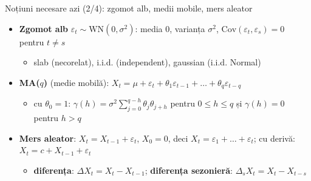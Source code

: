 \begin{frame}{Noțiuni necesare azi (2/4): zgomot alb, medii mobile, mers aleator}
\itemsize{\small}
\begin{itemize}
    \item \textbf{Zgomot alb} $\varepsilon_t \sim \mathrm{WN}(0, \sigma^2)$: media 0, varianța $\sigma^2$, $\mathrm{Cov}(\varepsilon_t, \varepsilon_s) = 0$ pentru $t \ne s$
    \begin{itemize}
        \item slab (necorelat), i.i.d. (independent), gaussian (i.i.d. Normal)
    \end{itemize}
    \item \textbf{MA($q$)} (medie mobilă): $X_t = \mu + \varepsilon_t + \theta_1\varepsilon_{t-1} + \dots + \theta_q\varepsilon_{t-q}$
    \begin{itemize}
        \item cu $\theta_0 = 1$: $\gamma(h) = \sigma^2\sum_{j=0}^{q-h}\theta_j\theta_{j+h}$ pentru $0 \le h \le q$ și $\gamma(h) = 0$ pentru $h > q$
    \end{itemize}
    \item \textbf{Mers aleator}: $X_t = X_{t-1} + \varepsilon_t$, $X_0 = 0$, deci $X_t = \varepsilon_1 + \dots + \varepsilon_t$; cu derivă: $X_t = c + X_{t-1} + \varepsilon_t$
    \begin{itemize}
        \item \textbf{diferența}: $\Delta X_t = X_t - X_{t-1}$; \textbf{diferența sezonieră}: $\Delta_sX_t = X_t - X_{t-s}$
    \end{itemize}
\end{itemize}
\end{frame}

